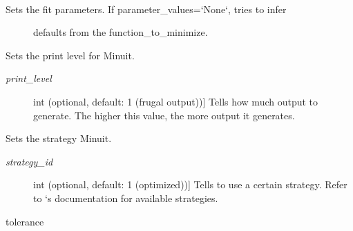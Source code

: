 \documentclass[a4paper,10pt,english]{sphinxmanual}
\begin{document}
\begin{fulllineitems}
\begin{fulllineitems}
\label{index:kafe.minuit.Minuit.set_parameter_values}~\begin{description}
\item[{Sets the fit parameters. If parameter\_values={}`None{}`, tries to infer}] \leavevmode
defaults from the function\_to\_minimize.

\end{description}

\end{fulllineitems}


\begin{fulllineitems}
\label{index:kafe.minuit.Minuit.set_print_level}
Sets the print level for Minuit.
\begin{description}
\item[{\emph{print\_level}}] \leavevmode{[}int (optional, default: 1 (frugal output)){]}
Tells  how much output to generate. The higher this
value, the more output it generates.

\end{description}

\end{fulllineitems}


\begin{fulllineitems}
\label{index:kafe.minuit.Minuit.set_strategy}
Sets the strategy Minuit.
\begin{description}
\item[{\emph{strategy\_id}}] \leavevmode{[}int (optional, default: 1 (optimized)){]}
Tells  to use a certain strategy. Refer to `s
documentation for available strategies.

\end{description}

\end{fulllineitems}


\begin{fulllineitems}
\label{index:kafe.minuit.Minuit.tolerance}
 tolerance


\end{fulllineitems}
\end{fulllineitems}
\end{document}
